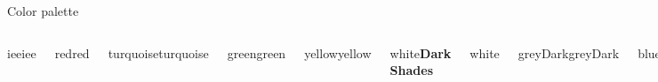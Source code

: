 \documentclass[aspectratio=169]{beamer}
\begin{document}
\begin{frame}{Color palette}
\begin{columns}[t]
            \begin{beamercolorbox}[center,colsep*=4pt]{iee}iee\strut\end{beamercolorbox}
            \begin{beamercolorbox}[center,colsep*=4pt]{red}red\strut\end{beamercolorbox}
            \begin{beamercolorbox}[center,colsep*=4pt]{turquoise}turquoise\strut\end{beamercolorbox}
            \begin{beamercolorbox}[center,colsep*=4pt]{green}green\strut\end{beamercolorbox}
            \begin{beamercolorbox}[center,colsep*=4pt]{yellow}yellow\strut\end{beamercolorbox}
            \begin{beamercolorbox}[center,colsep*=4pt]{white}\textbf{Dark Shades}\strut\end{beamercolorbox}
            \begin{beamercolorbox}[center,colsep*=4pt]{white}\strut\end{beamercolorbox}
            \begin{beamercolorbox}[center,colsep*=4pt]{greyDark}greyDark\strut\end{beamercolorbox}
            \begin{beamercolorbox}[center,colsep*=4pt]{blueDark}blueDark\strut\end{beamercolorbox}
            \begin{beamercolorbox}[center,colsep*=4pt]{ieeDark}ieeDark\strut\end{beamercolorbox}
            \begin{beamercolorbox}[center,colsep*=4pt]
            {redDark}redDark\strut\end{beamercolorbox}
            \begin{beamercolorbox}[center,colsep*=4pt]{turquoiseDark}turquoiseDark\strut\end{beamercolorbox}
            \begin{beamercolorbox}[center,colsep*=4pt]{greenDark}greenDark\strut\end{beamercolorbox}
            \begin{beamercolorbox}[center,colsep*=4pt]{yellowDark}yellowDark\strut\end{beamercolorbox}
    \end{columns}
\end{frame}
\end{document}

